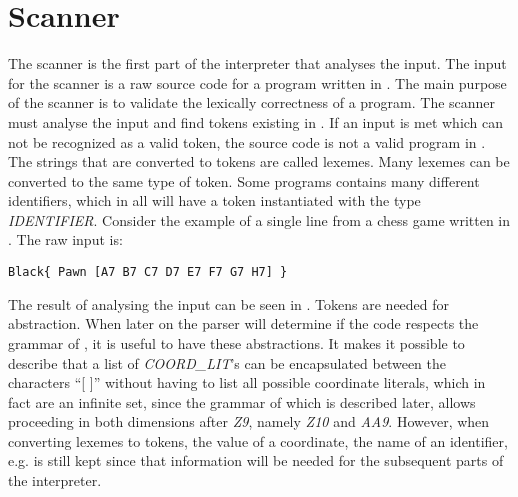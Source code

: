 \chapter{Scanner}
The scanner is the first part of the interpreter that analyses the input. The input for the scanner is a raw source code for a program written in \productname{}. The main purpose of the scanner is to validate the lexically correctness of a \productname{} program. The scanner must analyse the input and find tokens existing in \productname{}. If an input is met which can not be recognized as a valid token, the source code is not a valid program in \productname{}. The strings that are converted to tokens are called lexemes. Many lexemes can be converted to the same type of token. Some programs contains many different identifiers, which in \productname{} all will have a token instantiated with the type \textit{IDENTIFIER}. Consider the example of a single line from a chess game written in \Productname{}. The raw input is:
\begin{lstlisting}
Black{ Pawn [A7 B7 C7 D7 E7 F7 G7 H7] }
\end{lstlisting}
The result of analysing the input can be seen in . Tokens are needed for abstraction. When later on the parser will determine if the code respects the grammar of \productname{}, it is useful to have these abstractions. It makes it possible to describe that a list of \textit{COORD_LIT}'s can be encapsulated between the characters ``[ ]'' without having to list all possible coordinate literals, which in fact are an infinite set, since the grammar of \productname{} which is described later, allows proceeding in both dimensions after \textit{Z9}, namely \textit{Z10} and \textit{AA9}. However, when converting lexemes to tokens, the value of a coordinate, the name of an identifier, e.g. is still kept since that information will be needed for the subsequent parts of the interpreter.

